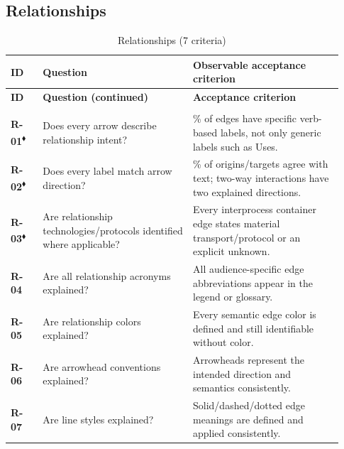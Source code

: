 \documentclass[10pt,letterpaper]{article}
\newcommand{\Gate}{\textsuperscript{\(\blacklozenge\)}}
\newcommand{\CheckRow}[3]{\textbf{\textsf{#1}} & #2 & #3\\[3pt]}
\newcommand{\ChecklistHeader}{\toprule
\textbf{ID} & \textbf{Question} & \textbf{Observable acceptance criterion}\\\midrule
\endfirsthead
\toprule\textbf{ID} & \textbf{Question (continued)} & \textbf{Acceptance criterion}\\\midrule
\endhead
\midrule\multicolumn{3}{r}{\footnotesize Continued on next page}\\\endfoot
\bottomrule\endlastfoot}
\begin{document}
\subsection{Relationships}
\begin{longtable}{@{}>{\raggedright\arraybackslash}p{0.09\linewidth}>{\raggedright\arraybackslash}p{0.42\linewidth}>{\raggedright\arraybackslash}p{0.42\linewidth}@{}}
\caption{Relationships (7 criteria)}\label{tab:review-R}\\
\ChecklistHeader
\CheckRow{R-01\Gate}{Does every arrow describe relationship intent?}{100\% of edges have specific verb-based labels, not only generic labels such as Uses.}
\CheckRow{R-02\Gate}{Does every label match arrow direction?}{100\% of origins/targets agree with text; two-way interactions have two explained directions.}
\CheckRow{R-03\Gate}{Are relationship technologies/protocols identified where applicable?}{Every interprocess container edge states material transport/protocol or an explicit unknown.}
\CheckRow{R-04}{Are all relationship acronyms explained?}{All audience-specific edge abbreviations appear in the legend or glossary.}
\CheckRow{R-05}{Are relationship colors explained?}{Every semantic edge color is defined and still identifiable without color.}
\CheckRow{R-06}{Are arrowhead conventions explained?}{Arrowheads represent the intended direction and semantics consistently.}
\CheckRow{R-07}{Are line styles explained?}{Solid/dashed/dotted edge meanings are defined and applied consistently.}
\end{longtable}
\end{document}
